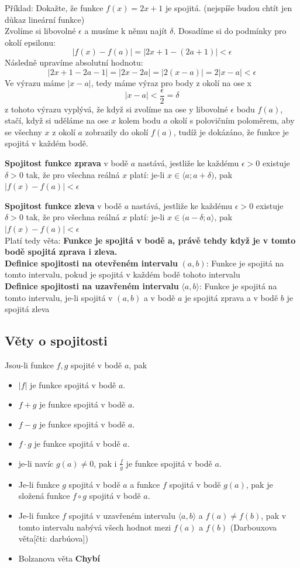 \documentclass[12pt]{article}
\begin{document}
Příklad: Dokažte, že funkce $f(x) = 2x+1$ je spojitá. (nejspíše budou chtít jen důkaz lineární funkce)\\
Zvolíme si libovolné $\epsilon$ a musíme k němu najít $\delta$.
Dosadíme si do podmínky pro okolí epsilonu:
\[|f(x)-f(a)| = |2x+1 - (2a+1)| < \epsilon\]
Následně upravíme absolutní hodnotu:
\[|2x+1-2a-1| = |2x-2a| = |2(x-a)| = 2|x-a|< \epsilon\]
Ve výrazu máme $|x-a|$, tedy máme výraz pro body z okolí na ose x
\[|x-a|<\frac{\epsilon}{2} = \delta\]
z tohoto výrazu vyplývá, že když si zvolíme na ose y libovolné $\epsilon$ bodu $f(a)$, stačí, když si uděláme na ose $x$ kolem bodu $a$ okolí s polovičním poloměrem, aby se všechny $x$ z okolí $a$ zobrazily do okolí $f(a)$, tudíž je dokázáno, že funkce je spojitá v každém bodě.


\textbf{Spojitost funkce zprava} v bodě $a$ nastává, jestliže ke každému $\epsilon > 0$ existuje $\delta > 0$ tak, že pro všechna reálná $x$ platí: je-li $x\in \langle a;a+\delta)$, pak $|f(x)- f(a)| < \epsilon$

\textbf{Spojitost funkce zleva} v bodě $a$ nastává, jestliže ke každému $\epsilon >0$ existuje $\delta > 0$ tak, že pro všechna reálná $x$ platí: je-li $x\in (a-\delta;a\rangle$, pak $|f(x)- f(a)|<\epsilon$\\
Platí tedy věta: \textbf{Funkce je spojitá v bodě a, právě tehdy když je v tomto bodě spojitá zprava i zleva.}\\
\textbf{Definice spojitosti na otevřeném intervalu} $(a,b)$: Funkce je spojitá na tomto intervalu, pokud je spojitá v každém bodě tohoto intervalu\\
\textbf{Definice spojitosti na uzavřeném intervalu} $\langle a,b\rangle$: Funkce je spojitá na tomto intervalu, je-li spojitá v $(a,b)$ a v bodě $a$ je spojitá zprava a v bodě $b$ je spojitá zleva\\

\subsection*{Věty o spojitosti}
Jsou-li funkce $f,g$ spojité v bodě $a$, pak
\begin{itemize}[itemsep = 2pt]
    \item $|f|$ je funkce spojitá v bodě $a$.
    \item $f + g$ je funkce spojitá v bodě $a$.
    \item $f-g$ je funkce spojitá v bodě $a$.
    \item $f \cdot g$ je funkce spojitá v bodě $a$.
    \item je-li navíc $g(a) \neq 0$, pak i $\frac{f}{g}$ je funkce spojitá v bodě $a$.
    \item Je-li funkce $g$ spojitá v bodě $a$ a funkce $f$ spojitá v bodě $g(a)$, pak je složená funkce $f\circ g$ spojitá v bodě $a$.
    \item Je-li funkce $f$ spojitá v uzavřeném intervalu $\langle a,b\rangle$ a $f(a) \neq f(b)$, pak v tomto intervalu nabývá všech hodnot mezi $f(a)$ a $f(b)$ (Darbouxova věta[čti: darbúova])
    \item Bolzanova věta \textbf{Chybí}
\end{itemize}
\end{document}
